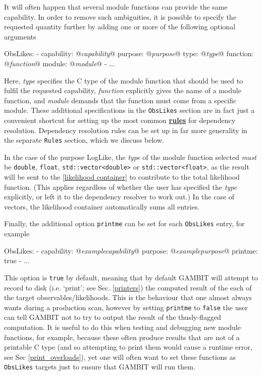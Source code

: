 \documentclass[pdftex,twocolumn,epjc3_preprint,runningheads]{svjour3}
\renewcommand{\_}{\discretionary{\underscore}{}{\underscore}}
\newcommand\cpp[1]{{\lstinline!#1!}}  %
\newcommand\yaml[1]{{\lstset{style=yaml}\lstinline!#1!\lstset{style=cpp}}}
\newcommand\yamlvalue[1]{{\YAMLvaluestyle\ttfamily#1}}
\newcommand\YAMLvaluestyle{\footnotesize\color{blue}\mdseries}
\newcommand{\cross}[1]{\ref{#1}}
\newcommand{\doublecross}[2]{\hyperref[#2]{\textbf{#1}}}
\newcommand{\metavarf}[1]{\textit{\color{darkgreen}\footnotesize\textrm{#1}}}
\newcommand{\metavar}{\metavarf}
\newcommand{\gambit}{\textsf{GAMBIT}\xspace}
\newcommand{\GB}{\gambit}
\newcommand\xx{\raisebox{0.2ex}{\smaller ++}\xspace}
\newcommand\Cpp{\textsf{C\xx}\xspace}
\begin{document}
It will often happen that several module functions can provide the same
capability.  In order to remove such ambiguities, it is possible to specify the
requested quantity further by adding one or more of the following optional
arguments
%
\begin{lstyaml}
ObsLikes:
  - capability: @\metavar{capability}@
    purpose: @\metavar{purpose}@
    type: @\metavar{type}@
    function: @\metavar{function}@
    module: @\metavar{module}@
  - ...
\end{lstyaml}
Here, \metavar{type} specifies the \Cpp type of the module function that should be used to fulfil the requested capability,
\metavar{function} explicitly gives the name of a module function, and \metavar{module} demands that the function must come from
a specific module.  These additional
specifications in the \yaml{ObsLikes} section  are in fact just a convenient
shortcut for setting up the most common \doublecross{rules}{rule} for dependency resolution.  Dependency resolution rules
can be set up in far more generality in the separate \yaml{Rules} section, which we discuss below.

In the case of the purpose \mbox{\yamlvalue{LogLike},} the
\metavar{type} of the module function selected \emph{must} be \mbox{\cpp{double},} \mbox{\cpp{float},}
\cpp{std::vector<double>} or \cpp{std::vector<float>}, as the result will be
sent to the \cross{likelihood container} to contribute to the total likelihood function.  (This applies regardless of whether the user has specified the \metavar{type} explicitly, or left it to the dependency resolver to work out.) In the case of vectors, the likelihood container automatically sums all entries.

Finally, the additional option \yaml{printme} can be set for each \yaml{ObsLikes} entry, for example
\begin{lstyaml}
ObsLikes:
  - capability: @\metavar{example\_capability}@
    purpose: @\metavar{example\_purpose}@
    printme: true
  - ...
\end{lstyaml}
This option is \yaml{true} by default, meaning that by default \GB will attempt to record to disk (i.e. `print'; see Sec. \ref{printers}) the computed result of the each of the target observables/likelihoods. This is the behaviour that one almost always wants during a production scan, however by setting \yaml{printme} to \yaml{false} the user can tell \GB not to try to output the result of the thusly-flagged computation. It is useful to do this when testing and debugging new module functions, for example, because these often produce results that are not of a printable \Cpp type (and so attempting to print them would cause a runtime error, see Sec \ref{print_overloads}), yet one will often want to set these functions as \yaml{ObsLikes} targets just to ensure that \GB will run them.
\end{document}
